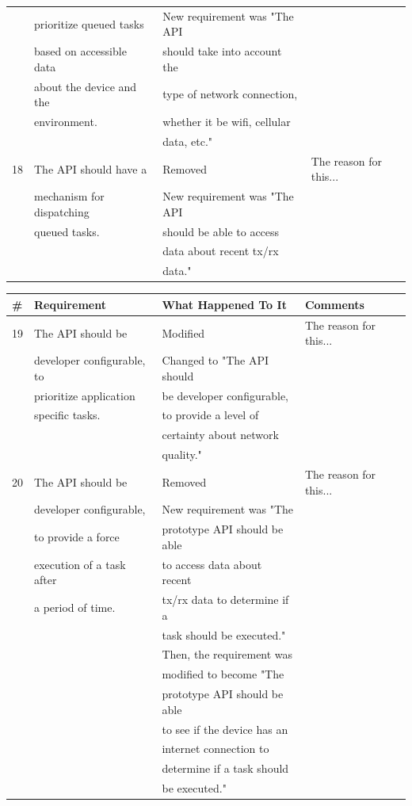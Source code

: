 \documentclass[12pt]{article}
\begin{document}
\begin{tabular}{|l|l|l|l|}
	& prioritize queued tasks 	& New requirement was "The API& \\
	& based on accessible data  & should take into account the& \\
	& about the device and the  & type of network connection, & \\
	& environment.				& whether it be wifi, cellular& \\
	&							& data, etc."				  & \\ \hline
18	& The API should have a 	& Removed					  & The reason for this... \\
	& mechanism for dispatching & New requirement was "The API& \\
	& queued tasks.				& should be able to access 	  & \\
	&							& data about recent tx/rx 	  & \\
	&							& data."					  & \\ \hline
\end{tabular}
\pagebreak

\begin{tabular}{|l|l|l|l|}
\hline
\#  & Requirement 				& What Happened To It 		  & Comments \\ \hline
19 	& The API should be  	    & Modified 					  & The reason for this... \\
	& developer configurable, to& Changed to "The API should  & \\
	& prioritize application 	& be developer configurable,  & \\
	& specific tasks.			& to provide a level of 	  & \\
	&							& certainty about network 	  & \\
	&							& quality."					  & \\ \hline
20 	& The API should be  	    & Removed					  & The reason for this... \\
	& developer configurable,   & New requirement was "The 	  & \\
	& to provide a force  	    & prototype API should be able& \\
	& execution of a task after & to access data about recent & \\
	& a period of time.			& tx/rx data to determine if a& \\
	&							& task should be executed."	  & \\
	&							& Then, the requirement was   & \\
	&							& modified to become "The 	  & \\
	&							& prototype API should be able& \\
	&							& to see if the device has an & \\
	&							& internet connection to 	  & \\
	&							& determine if a task should  & \\
	&							& be executed."				  & \\ \hline
\end{tabular}
\pagebreak
\end{document}
